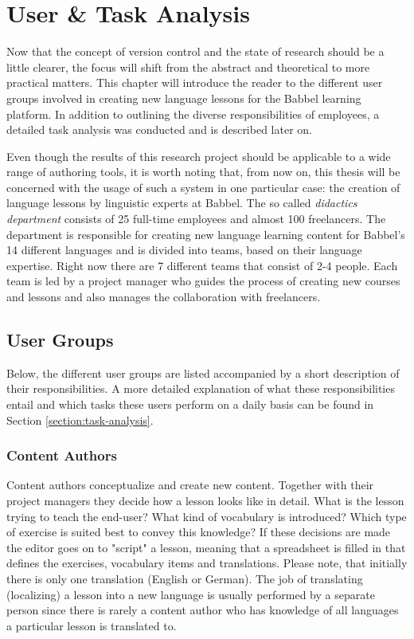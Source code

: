\chapter{User \& Task Analysis} \label{chapter:user-research}
Now that the concept of version control and the state of research should be a little clearer, the focus will shift from the abstract and theoretical to more practical matters. This chapter will introduce the reader to the different user groups involved in creating new language lessons for the Babbel learning platform. In addition to outlining the diverse responsibilities of employees, a detailed task analysis was conducted and is described later on.

Even though the results of this research project should be applicable to a wide range of authoring tools, it is worth noting that, from now on, this thesis will be concerned with the usage of such a system in one particular case: the creation of language lessons by linguistic experts at Babbel. The so called \textit{didactics department} consists of 25 full-time employees and almost 100 freelancers. The department is responsible for creating new language learning content for Babbel's 14 different languages and is divided into teams, based on their language expertise. Right now there are 7 different teams that consist of 2-4 people. Each team is led by a project manager who guides the process of creating new courses and lessons and also manages the collaboration with freelancers.

\section{User Groups}
Below, the different user groups are listed accompanied by a short description of their responsibilities. A more detailed explanation of what these responsibilities entail and which tasks these users perform on a daily basis can be found in Section \ref{section:task-analysis}.

\subsection{Content Authors}
Content authors conceptualize and create new content. Together with their project managers they decide how a lesson looks like in detail. What is the lesson trying to teach the end-user? What kind of vocabulary is introduced? Which type of exercise is suited best to convey this knowledge? If these decisions are made the editor goes on to "script" a lesson, meaning that a spreadsheet is filled in that defines the exercises, vocabulary items and translations. Please note, that initially there is only one translation (English or German). The job of translating (localizing) a lesson into a new language is usually performed by a separate person since there is rarely a content author who has knowledge of all languages a particular lesson is translated to.

